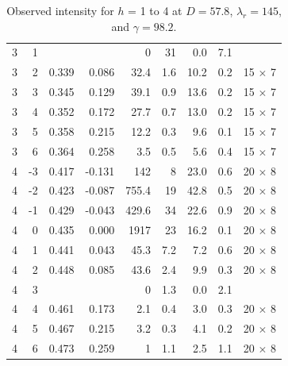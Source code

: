 \begin{table}[htbp]
\begin{tabular}{rrrrrrrrc}
3     & 1     &       &       & 0     & 31    & 0.0   & 7.1   &  \\
3     & 2     & 0.339 & 0.086 & 32.4  & 1.6   & 10.2  & 0.2   & 15 $\times$ 7 \\
3     & 3     & 0.345 & 0.129 & 39.1  & 0.9   & 13.6  & 0.2   & 15 $\times$ 7 \\
3     & 4     & 0.352 & 0.172 & 27.7  & 0.7   & 13.0  & 0.2   & 15 $\times$ 7 \\
3     & 5     & 0.358 & 0.215 & 12.2  & 0.3   & 9.6   & 0.1   & 15 $\times$ 7 \\
3     & 6     & 0.364 & 0.258 & 3.5   & 0.5   & 5.6   & 0.4   & 15 $\times$ 7 \\
4     & -3    & 0.417 & -0.131 & 142   & 8     & 23.0  & 0.6   & 20 $\times$ 8 \\
4     & -2    & 0.423 & -0.087 & 755.4 & 19    & 42.8  & 0.5   & 20 $\times$ 8 \\
4     & -1    & 0.429 & -0.043 & 429.6 & 34    & 22.6  & 0.9   & 20 $\times$ 8 \\
4     & 0     & 0.435 & 0.000 & 1917  & 23    & 16.2  & 0.1   & 20 $\times$ 8 \\
4     & 1     & 0.441 & 0.043 & 45.3  & 7.2   & 7.2   & 0.6   & 20 $\times$ 8 \\
4     & 2     & 0.448 & 0.085 & 43.6  & 2.4   & 9.9   & 0.3   & 20 $\times$ 8 \\
4     & 3     &       &       & 0     & 1.3   & 0.0   & 2.1   &  \\
4     & 4     & 0.461 & 0.173 & 2.1   & 0.4   & 3.0   & 0.3   & 20 $\times$ 8 \\
4     & 5     & 0.467 & 0.215 & 3.2   & 0.3   & 4.1   & 0.2   & 20 $\times$ 8 \\
4     & 6     & 0.473 & 0.259 & 1     & 1.1   & 2.5   & 1.1   & 20 $\times$ 8 \\
    \hline
  \end{tabular}
  \caption{Observed intensity for $h$ = 1 to 4 at $D=57.8$, $\lambda_r=145$, and 
  $\gamma=98.2$\textdegree.}
  \label{tb:obs_intensity1}
\end{table}  

